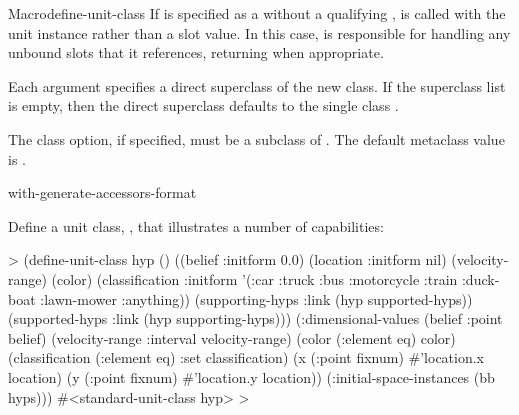 \documentclass[10pt,twoside,english,pdftex]{article}
\begin{document}
\begin{functiondoc}{Macro}{define-unit-class}
%
If  is specified as a  without a
qualifying ,  is called with the unit
instance rather than a slot value.  In this case,  is
responsible for handling any unbound slots that it references, returning
 when appropriate.

%
Each  argument specifies a direct superclass of the new
class. If the superclass list is empty, then the direct superclass defaults to
the single class .

%
The  class option, if specified, must be a subclass of
.  The default metaclass
value is .

\classoptioninheritance

\begin{alsos}{with-generate-accessors-format}
\end{alsos}

\fnexamples
%
Define a unit class, , that illustrates a number of
 capabilities:
%
\W\supp
\begin{example}
  > (define-unit-class hyp ()
      ((belief :initform 0.0)
       (location :initform nil)
       (velocity-range)
       (color)
       (classification :initform '(:car :truck :bus :motorcycle :train :duck-boat 
                                   :lawn-mower :anything))
       (supporting-hyps 
        :link (hyp supported-hyps))
       (supported-hyps 
        :link (hyp supporting-hyps)))
      (:dimensional-values 
       (belief :point belief)
       (velocity-range :interval velocity-range)
       (color (:element eq) color)
       (classification (:element eq) :set classification)
       (x (:point fixnum) #'location.x location)
       (y (:point fixnum) #'location.y location))
      (:initial-space-instances (bb hyps)))
  #<standard-unit-class hyp>
  >
\end{example}


\end{functiondoc}
\end{document}
